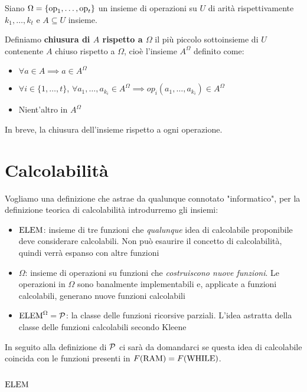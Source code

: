 Siano $\Omega = \{\operatorname{op}_1, \dots, \operatorname{op}_t\}$ un insieme di operazioni su $U$ di arità rispettivamente $k_1, \dots, k_t$ e $A \subseteq U$ insieme. 

Definiamo \textbf{chiusura di $A$ rispetto a $\Omega$} il più piccolo sottoinsieme di $U$ contenente $A$ chiuso rispetto a $\Omega$, cioè l'insieme $A^\Omega$ definito come:

\begin{itemize}
	\item $\forall a \in A \implies a \in A^\Omega$
	
    \item $\forall i \in \{1, \dots, t\}$, $\forall a_1, \dots, a_{k_i} \in A^\Omega \implies op_i \left(a_1, \dots, a_{k_i}\right) \in A^\Omega$
	
    \item Nient'altro in $A^\Omega$
\end{itemize}

In breve, la chiusura dell'insieme rispetto a ogni operazione.

\section{Calcolabilità}
Vogliamo una definizione che astrae da qualunque connotato "informatico", per la definizione teorica di calcolabilità introdurremo gli insiemi:
\begin{itemize} 
	\item \textbf{$\text{ELEM}$}: insieme di tre funzioni che \textit{qualunque} idea di calcolabile proponibile deve considerare calcolabili. Non può esaurire il concetto di calcolabilità, quindi verrà espanso con altre funzioni
	
	\item $\Omega$: insieme di operazioni su funzioni che \textit{costruiscono nuove funzioni}. Le operazioni in $\Omega$ sono banalmente implementabili e, applicate a funzioni calcolabili, generano nuove funzioni calcolabili
	
	\item \textbf{$\text{ELEM}^\Omega = \mathcal{P}$}: la classe delle funzioni ricorsive parziali. L'idea astratta della classe delle funzioni calcolabili secondo Kleene
\end{itemize}

In seguito alla definizione di $\mathcal{P}$ ci sarà da domandarci se questa idea di calcolabile coincida con le funzioni presenti in $F(\text{RAM}) = F(\text{WHILE})$.

\subsection{$\text{ELEM}$}

